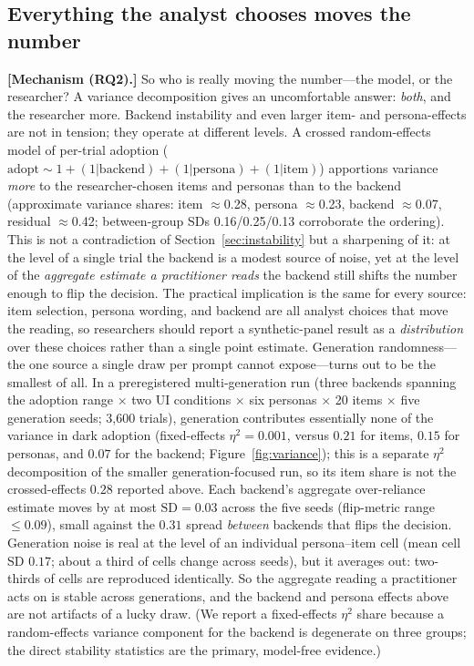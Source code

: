\documentclass[manuscript,nonacm]{acmart}
\begin{document}
\subsection{Everything the analyst chooses moves the number}
\label{sec:variance}
\textbf{[Mechanism (RQ2).]} So who is really moving the number---the model, or the researcher? A variance decomposition gives an
uncomfortable answer: \emph{both}, and the researcher more. Backend instability and even larger item- and
persona-effects are not in tension; they operate at different levels. A crossed random-effects model of per-trial adoption ($\text{adopt}\sim 1+(1|\text{backend})+(1|\text{persona})
+(1|\text{item})$) apportions variance \emph{more} to the researcher-chosen items and personas than to the
backend (approximate variance shares: item $\approx$0.28, persona $\approx$0.23, backend $\approx$0.07,
residual $\approx$0.42; between-group SDs 0.16/0.25/0.13 corroborate the ordering). This is not a
contradiction of Section~\ref{sec:instability} but a sharpening of it: at the level of a single trial the
backend is a modest source of noise, yet at the level of the \emph{aggregate estimate a practitioner reads}
the backend still shifts the number enough to flip the decision. The practical implication is the same for
every source: item selection, persona wording, and backend are all analyst choices that move the reading,
so researchers should report a synthetic-panel result as a \emph{distribution} over these choices rather
than a single point estimate. Generation randomness---the one source a single draw per prompt cannot expose---turns out to be
the smallest of all. In a preregistered multi-generation run (three backends spanning the adoption range
$\times$ two UI conditions $\times$ six personas $\times$ 20 items $\times$ five generation seeds; 3{,}600 trials), generation
contributes essentially none of the variance in dark adoption (fixed-effects $\eta^2=0.001$, versus $0.21$
for items, $0.15$ for personas, and $0.07$ for the backend; Figure~\ref{fig:variance}); this is a separate
$\eta^2$ decomposition of the smaller generation-focused run, so its item share is not the crossed-effects
$0.28$ reported above. Each backend's aggregate over-reliance
estimate moves by at most $\text{SD}=0.03$ across the five seeds (flip-metric range $\le0.09$), small
against the $0.31$ spread \emph{between} backends that flips the decision. Generation noise is real at the
level of an individual persona--item cell (mean cell SD $0.17$; about a third of cells change across seeds),
but it averages out: two-thirds of cells are reproduced identically. So the aggregate reading a
practitioner acts on is stable across generations, and the backend and persona effects above are not
artifacts of a lucky draw. (We report a fixed-effects $\eta^2$ share because a random-effects variance
component for the backend is degenerate on three groups; the direct stability statistics are the primary,
model-free evidence.)
\end{document}
